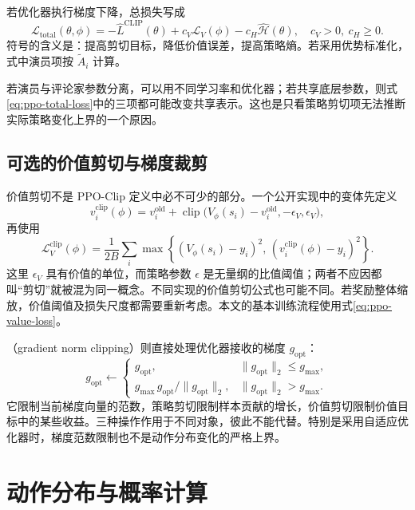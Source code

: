 \documentclass[UTF8]{ctexart}
\begin{document}
若优化器执行梯度下降，总损失写成
\begin{equation}
  \mathcal L_{\mathrm{total}}(\theta,\phi)
  =-\widehat L^{\mathrm{CLIP}}(\theta)
   +c_V\mathcal L_V(\phi)
   -c_H\widehat{\mathcal H}(\theta),
  \quad c_V>0,\ c_H\ge0.
  \label{eq:ppo-total-loss}
\end{equation}
符号的含义是：提高剪切目标，降低价值误差，提高策略熵。若采用优势标准化，式中演员项按 $\widetilde A_i$ 计算。

若演员与评论家参数分离，可以用不同学习率和优化器；若共享底层参数，则式\eqref{eq:ppo-total-loss}中的三项都可能改变共享表示。这也是只看策略剪切项无法推断实际策略变化上界的一个原因。

\subsection{可选的价值剪切与梯度裁剪}

价值剪切不是 PPO-Clip 定义中必不可少的部分。一个公开实现中的变体\cite{openai-baselines-ppo2}先定义
\[
  v_i^{\mathrm{clip}}(\phi)
  =v_i^{\mathrm{old}}
   +\operatorname{clip}\bigl(
      V_\phi(s_i)-v_i^{\mathrm{old}},-\epsilon_V,\epsilon_V
    \bigr),
\]
再使用
\begin{equation}
  \mathcal L_V^{\mathrm{clip}}(\phi)
  =\frac1{2B}\sum_i
    \max\left\{
      (V_\phi(s_i)-y_i)^2,\,
      (v_i^{\mathrm{clip}}(\phi)-y_i)^2
    \right\}.
  \label{eq:ppo-value-clipping}
\end{equation}
这里 $\epsilon_V$ 具有价值的单位，而策略参数 $\epsilon$ 是无量纲的比值阈值；两者不应因都叫“剪切”就被混为同一概念。不同实现的价值剪切公式也可能不同。若奖励整体缩放，价值阈值及损失尺度都需要重新考虑。本文的基本训练流程使用式\eqref{eq:ppo-value-loss}。

（gradient norm clipping）则直接处理优化器接收的梯度 $g_{\mathrm{opt}}$：
\[
  g_{\mathrm{opt}}
  \leftarrow
  \begin{cases}
    g_{\mathrm{opt}},&\|g_{\mathrm{opt}}\|_2\le g_{\max},\\
    g_{\max}\,g_{\mathrm{opt}}/\|g_{\mathrm{opt}}\|_2,
       &\|g_{\mathrm{opt}}\|_2>g_{\max}.
  \end{cases}
\]
它限制当前梯度向量的范数，策略剪切限制样本贡献的增长，价值剪切限制价值目标中的某些收益。三种操作作用于不同对象，彼此不能代替。特别是采用自适应优化器时，梯度范数限制也不是动作分布变化的严格上界。

\section{动作分布与概率计算}
\label{sec:ppo-action-distributions}
\end{document}
